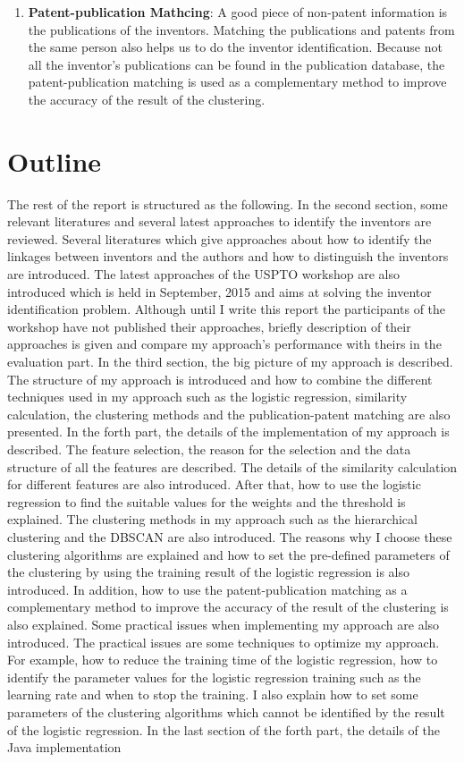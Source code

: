 \begin{enumerate}
\item \textbf{Patent-publication Mathcing}: A good piece of non-patent information is the publications of the inventors. Matching the publications and patents from the same person also helps us to do the inventor identification. Because not all the inventor's publications can be found in the publication database, the patent-publication matching is used as  a complementary method to improve the accuracy of the result of the clustering.

\end{enumerate}
 

\section{Outline}
The rest of the report is structured as the following. In the second section,  some relevant literatures and several latest approaches to identify the inventors are reviewed.  Several literatures which give approaches about how to identify the linkages between inventors and the authors and how to distinguish the inventors are introduced. The latest approaches of the USPTO workshop are also introduced which is held in September, 2015 and aims at solving the inventor identification problem. Although until I write this report the participants of the workshop have not published their approaches, briefly description of their approaches is given and compare my approach's performance with theirs in the evaluation part. In the third section,  the big picture of my approach is described.  The structure of my approach  is introduced and how to combine the different techniques used in my approach such as the logistic regression, similarity calculation, the clustering methods and the publication-patent matching are also presented. In the forth part, the details of the implementation of my approach is described. The  feature selection, the reason for the selection and the data structure of all the features are described. The details of the similarity calculation for different features are also introduced. After that, how to use the logistic regression to find the suitable values for the weights and the threshold is explained.  The clustering methods in my approach such as the hierarchical clustering and the DBSCAN are also introduced.  The reasons why I choose these clustering algorithms are explained and how to set the pre-defined parameters of the clustering by using the training result of the logistic regression is also introduced. In addition, how to use the patent-publication matching as a complementary method to improve the accuracy of the result of the clustering is also explained. Some practical issues when  implementing my approach are also introduced. The practical issues are some techniques to optimize my approach. For example, how to reduce the training time of the logistic regression, how to identify the parameter values for the logistic regression training such as the learning rate and when to stop the training. I also explain how to set some parameters of the clustering algorithms which cannot be identified by the result of the logistic regression. In the last section of the forth part, the details of the Java implementation 